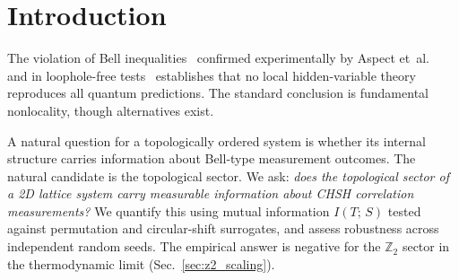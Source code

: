 \documentclass[aps,pra,twocolumn,superscriptaddress,showpacs,floatfix]{revtex4-2}
\newcommand{\Ztwo}{\mathbb{Z}_2}
\newcommand{\MI}{I(T;\,S)}
\begin{document}
\begin{abstract}
Under a phase deformation $\delta$ of these data, the maximum on a 50-point
$\delta$-grid is $|S| = 2.8114$ ($99.40\%$) at $\delta \approx 1.44\pi$, for
the sequence ABABABABABAB; as a grid maximum it is a lower bound on the
maximum over $\delta$. Generic $\delta \neq 0$ breaks the Yang--Baxter/hexagon
consistency of the braid representation, so that value characterizes a
deformed representation rather than the standard category. The CHSH-form
values depend strongly on $\delta$: with fixed measurement settings (from a
numerical search at $\delta \approx 1.44\pi$), $|S|$ for that sequence ranges
from near zero to $2.72$ (above 2 at only $14\%$ of the $200$ $\delta$ values
sampled), while settings adapted to each $\delta$ give $|S| > 2$ at $99.5\%$
of them.

\vspace{4pt}
\noindent\textbf{Keywords:} CHSH inequality, topological order, mutual
information, lattice gauge theory, toric code, Fibonacci anyons, Ising anyons,
Bell correlations, non-Abelian braiding
\end{abstract}

\maketitle



\section{Introduction}
\label{sec:intro}

The violation of Bell inequalities~\cite{Bell1964} confirmed experimentally by
Aspect et~al.~\cite{Aspect1982} and in loophole-free tests~\cite{Hensen2015,Giustina2015}
establishes that no local hidden-variable theory reproduces all quantum
predictions. The standard conclusion is fundamental nonlocality, though
alternatives exist.

A natural question for a topologically ordered system is whether its internal
structure carries information about Bell-type measurement outcomes. The natural
candidate is the topological sector. We ask: \emph{does the topological sector of
a 2D lattice system carry measurable information about CHSH correlation
measurements?} We quantify this using mutual information $\MI$ tested against permutation and circular-shift surrogates, and assess robustness across independent random seeds. The
empirical answer is negative for the $\Ztwo$ sector in the thermodynamic limit
(Sec.~\ref{sec:z2_scaling}).
\end{document}
